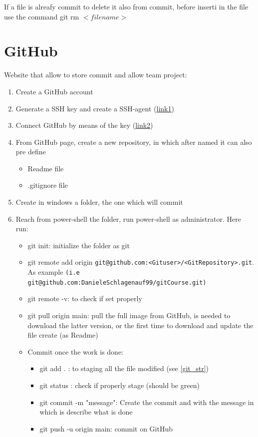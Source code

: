 \documentclass{report}
\begin{document}
If a file is alreafy commit to delete it also from commit, before inserti in the file use the command \newline
 git rm $<filename>$ 




\section{GitHub} \label{GitHub}
Website that allow to store commit and allow team project:
\begin{enumerate}
    \item Create a GitHub account 
    \item Generate a SSH key and create a SSH-agent (\href{https://docs.github.com/en/authentication/connecting-to-github-with-ssh/generating-a-new-ssh-key-and-adding-it-to-the-ssh-agent}{link1})
    \item Connect GitHub by means of the key (\href{https://docs.github.com/en/authentication/connecting-to-github-with-ssh/adding-a-new-ssh-key-to-your-github-account}{link2})
    \item From GitHub page, create a new repository, in which after named it can also pre define  
    \begin{itemize}
        \item Readme file
        \item .gitignore file
    \end{itemize}
    \item Create in windows a folder, the one which will commit 
    \item Reach from power-shell the folder, run power-shell as administrator. Here run:
    \begin{itemize}
        \item git init: initialize the folder as git 
        \item git remote add origin \texttt{git@github.com:<Gituser>/<GitRepository>.git}. \newline As example \texttt{(i.e git@github.com:DanieleSchlagenauf99/gitCourse.git)}
        \item git remote -v: to check if set properly
        \item git pull origin main: pull the full image from GitHub, is needed to download the latter version, or the first time to download and update the file create (as Readme)
        \item Commit once the work is done:
        \begin{itemize}
            \item git add . : to staging all the file modified (see \autoref{git_str})
            \item git status : check if properly stage (should be green)
            \item git commit -m "message": Create the commit and with the message in which is describe what is done 
            \item git push -u origin main: commit on GitHub
        \end{itemize}
    \end{itemize}
\end{enumerate}
\end{document}
